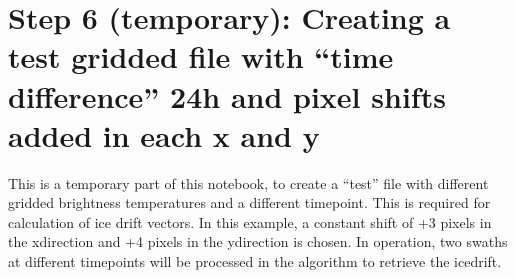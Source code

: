 \documentclass[letterpaper,10pt,english]{jupyterBook}
\begin{document}
\section{Step 6 (temporary): Creating a test gridded file with “time difference” 24h and pixel shifts added in each x and y}
\label{\detokenize{CIMR_L2_Sea_Ice_Drift_preproc:step-6-temporary-creating-a-test-gridded-file-with-time-difference-24h-and-pixel-shifts-added-in-each-x-and-y}}
\sphinxAtStartPar
This is a temporary part of this notebook, to create a “test” file with different gridded brightness temperatures and a different timepoint. This is required for calculation of ice drift vectors. In this example, a constant shift of +3 pixels in the x\sphinxhyphen{}direction and +4 pixels in the y\sphinxhyphen{}direction is chosen. In operation, two swaths at different timepoints will be processed in the algorithm to retrieve the icedrift.
\end{document}
